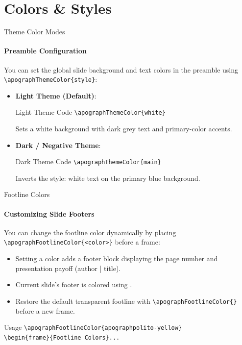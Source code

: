 
\section{Colors \& Styles}

\begin{frame}[fragile]{Theme Color Modes}
\framesubtitle{Preamble Configuration}
You can set the global slide background and text colors in the preamble using \verb|\apographThemeColor{style}|:
\begin{itemize}
    \item \textbf{Light Theme (Default)}:
    \begin{block}{Light Theme Code}
    \verb|\apographThemeColor{white}|
    \end{block}
    Sets a white background with dark grey text and primary-color accents.
    \item \textbf{Dark / Negative Theme}:
    \begin{block}{Dark Theme Code}
    \verb|\apographThemeColor{main}|
    \end{block}
    Inverts the style: white text on the primary blue background.
\end{itemize}
\end{frame}

\begin{frame}[fragile]{Footline Colors}
\framesubtitle{Customizing Slide Footers}
You can change the footline color dynamically by placing \verb|\apographFootlineColor{<color>}| before a frame:
\begin{itemize}
    \item Setting a color adds a footer block displaying the page number and presentation payoff (author | title).
    \item Current slide's footer is colored using .
    \item Restore the default transparent footline with \verb|\apographFootlineColor{}| before a new frame.
\end{itemize}
\begin{block}{Usage}
\verb|\apographFootlineColor{apographpolito-yellow}| \\
\verb|\begin{frame}{Footline Colors}...|
\end{block}
\end{frame}

